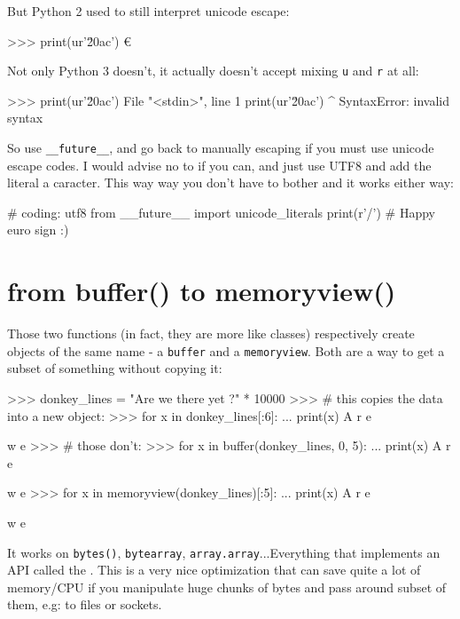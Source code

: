 \begin{py2}
\begin{py2}
\begin{py2}
\begin{py2}
But Python 2 used to still interpret unicode escape:

\begin{py2}
>>> print(ur'\u20ac')
€
\end{py2}

Not only Python 3 doesn't, it actually doesn't accept mixing \lstinline{u} and \lstinline{r} at all:

\begin{py3}
>>> print(ur'\u20ac')
File "<stdin>", line 1
    print(ur'\u20ac')
                    ^
SyntaxError: invalid syntax
\end{py3}

So use \lstinline{__future__}, and go back to manually escaping if you must use unicode escape codes. I would advise no to if you can, and just use UTF8 and add the literal a caracter. This way way you don't have to bother and it works either way:

\begin{py2and3}
# coding: utf8
from __future__ import unicode_literals
print(r'\€/') # Happy euro sign :)
\end{py2and3}

\section{from buffer() to memoryview()}

Those two functions (in fact, they are more like classes) respectively create objects of the same name - a \lstinline{buffer} and a \lstinline{memoryview}. Both are a way to get a subset of something without copying it:

\begin{py2}
>>> donkey_lines = "Are we there yet ?\n" * 10000
>>> # this copies the data into a new object:
>>> for x in donkey_lines[:6]:
...    print(x)
A
r
e

w
e
>>> # those don't:
>>> for x in buffer(donkey_lines, 0, 5):
...    print(x)
A
r
e

w
e
>>> for x in memoryview(donkey_lines)[:5]:
...    print(x)
A
r
e

w
e
\end{py2}

It works on \lstinline{bytes()}, \lstinline{bytearray}, \lstinline{array.array}...Everything that implements an \gls{API} called the . This is a very nice optimization that can save quite a lot of memory/CPU if you manipulate huge chunks of bytes and pass around subset of them, e.g: to files or sockets.


\end{py2}
\end{py2}
\end{py2}
\end{py2}
